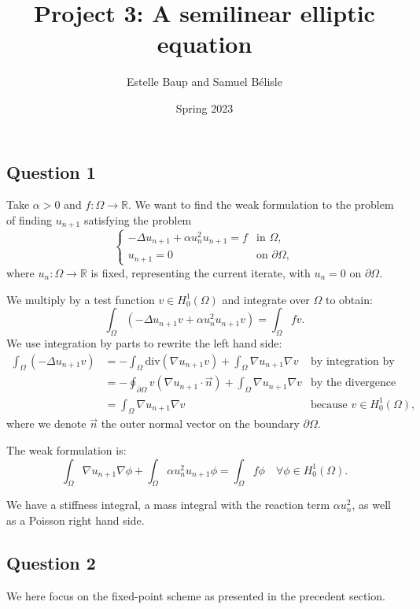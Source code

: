 \documentclass[11pt, a4paper, twoside]{article}
\newcommand{\R}{\mathbb{R}} %
\newcommand{\grad}{\nabla} %
\renewcommand{\div}{\text{div}} %
\newcommand{\Hunz}{H^1_0(\Omega)}
\newcommand{\intom}{\int_\Omega}
\newcommand{\intbd}{\oint_{\partial \Omega}}
\begin{document}
\title{Project 3: A semilinear elliptic equation}
\author{Estelle Baup and Samuel Bélisle}
\date{Spring 2023}
\maketitle 

\subsection*{Question 1}
Take $\alpha > 0$ and $f : \Omega \to \R$.
We want to find the weak formulation to the problem of finding $u_{n+1}$ satisfying the problem
$$\begin{cases}  - \Delta u_{n+1} + \alpha u_n^2 u_{n+1} = f & \text{in } \Omega,\\
u_{n+1} = 0 &\text{on } \partial\Omega,
\end{cases}$$
where $u_n : \Omega \to \R$ is fixed, representing the current iterate, with $u_n = 0$ on $\partial\Omega$.\newline

We multiply by a test function $v\in \Hunz$ and integrate over $\Omega$ to obtain:
$$\intom \left( -\Delta u_{n+1} v + \alpha u_n^2 u_{n+1} v \right) = \intom fv .$$
We use integration by parts to rewrite the left hand side:
\begin{align*}
 \intom (-\Delta u_{n+1} v)
 &= - \intom \div(\grad u_{n+1} v) + \intom \grad u_{n+1} \grad v
 	&\text{by integration by part}
 \\%
 &= - \intbd v (\grad u_{n+1} \cdot \vec n) + \intom \grad u_{n+1} \grad v
 	&\text{by the divergence theorem}
 \\%
 &=  \intom \grad u_{n+1} \grad v
 	&\text{because } v\in\Hunz,
\end{align*}
where we denote $\vec n$ the outer normal vector on the boundary $\partial \Omega$.

The weak formulation is:
\begin{equation}
\label{weak_f} \tag{E1}
\intom
\grad u_{n+1} \grad \phi
+ 
\intom
\alpha u_n^2 u_{n+1} \phi
= \intom f\phi
\quad \forall \phi \in\Hunz.
\end{equation}

We have a stiffness integral, a mass integral with the reaction term $\alpha u_n^2$, as well as a Poisson right hand side.

\subsection*{Question 2}
We here focus on the fixed-point scheme as presented in the precedent section.
\end{document}
